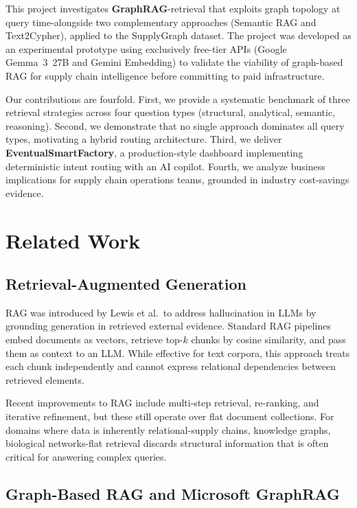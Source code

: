 \documentclass[11pt,a4paper]{article}
\begin{document}
This project investigates \textbf{GraphRAG}-retrieval that exploits graph topology at query time-alongside two complementary approaches (Semantic RAG and Text2Cypher), applied to the SupplyGraph dataset. The project was developed as an experimental prototype using exclusively free-tier APIs (Google Gemma~3~27B and Gemini Embedding) to validate the viability of graph-based RAG for supply chain intelligence before committing to paid infrastructure.

Our contributions are fourfold. First, we provide a systematic benchmark of three retrieval strategies across four question types (structural, analytical, semantic, reasoning). Second, we demonstrate that no single approach dominates all query types, motivating a hybrid routing architecture. Third, we deliver \textbf{EventualSmartFactory}, a production-style dashboard implementing deterministic intent routing with an AI copilot. Fourth, we analyze business implications for supply chain operations teams, grounded in industry cost-savings evidence.

\section{Related Work}

\subsection{Retrieval-Augmented Generation}

RAG was introduced by Lewis et al.\ to address hallucination in LLMs by grounding generation in retrieved external evidence. Standard RAG pipelines embed documents as vectors, retrieve top-$k$ chunks by cosine similarity, and pass them as context to an LLM. While effective for text corpora, this approach treats each chunk independently and cannot express relational dependencies between retrieved elements.

Recent improvements to RAG include multi-step retrieval, re-ranking, and iterative refinement, but these still operate over flat document collections. For domains where data is inherently relational-supply chains, knowledge graphs, biological networks-flat retrieval discards structural information that is often critical for answering complex queries.

\subsection{Graph-Based RAG and Microsoft GraphRAG}
\end{document}
